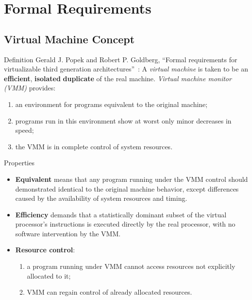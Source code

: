 \section{Formal Requirements}

\subsection{Virtual Machine Concept}

\begin{frame}{Definition}
Gerald J. Popek and Robert P. Goldberg, ``Formal requirements for
virtualizable third generation architectures''~\cite{goldberg}:
\vfill\pause
A \textit{virtual machine} is taken to be an \textbf{efficient},
\textbf{isolated} \textbf{duplicate} of the real machine.
\vfill\pause
\textit{Virtual machine monitor (VMM)} provides:
\begin{enumerate}
\item an environment for programs equivalent to the original machine;\pause
\item programs run in this environment show at worst only minor decreases in
  speed;\pause
\item the VMM is in complete control of system resources.
\end{enumerate}
\end{frame}

\begin{frame}{Properties}
\begin{itemize}
\item \textbf{Equivalent} means that any program running under the
  VMM control should demonstrated identical to the original machine behavior,
  except differences caused by the availability of system resources and
  timing.\pause
\item \textbf{Efficiency} demands that a statistically dominant subset of the
  virtual processor's instructions is executed directly by the real processor,
  with no software intervention by the VMM.\pause
\item \textbf{Resource control}:
  \begin{enumerate}
  \item a program running under VMM cannot access resources not explicitly
    allocated to it;
  \item VMM can regain control of already allocated resources.
  \end{enumerate}
\end{itemize}
\end{frame}


